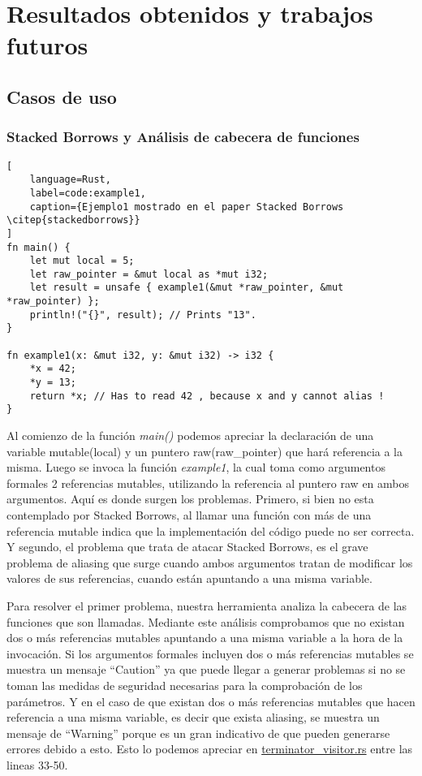 \chapter{Resultados obtenidos y trabajos futuros}
\section{Casos de uso}
\subsection{Stacked Borrows y Análisis de cabecera de funciones}

\begin{lstlisting}[
    language=Rust,
    label=code:example1,
    caption={Ejemplo1 mostrado en el paper Stacked Borrows \citep{stackedborrows}}
]
fn main() {
    let mut local = 5;
    let raw_pointer = &mut local as *mut i32;
    let result = unsafe { example1(&mut *raw_pointer, &mut *raw_pointer) };
    println!("{}", result); // Prints "13".
}

fn example1(x: &mut i32, y: &mut i32) -> i32 {
    *x = 42;
    *y = 13;
    return *x; // Has to read 42 , because x and y cannot alias !
}
\end{lstlisting}

Al comienzo de la función \textit{main()} podemos apreciar la declaración de una variable mutable(local) y un puntero raw(raw\_pointer) que hará referencia a la misma. Luego se invoca la función \textit{example1}, la cual toma como argumentos formales 2 referencias mutables, utilizando la referencia al puntero raw en ambos argumentos. Aquí es donde surgen los problemas. Primero, si bien no esta contemplado por Stacked Borrows, al llamar una función con más de una referencia mutable indica que la implementación del código puede no ser correcta. Y segundo, el problema que trata de atacar Stacked Borrows, es el grave problema de aliasing que surge cuando ambos argumentos tratan de modificar los valores de sus referencias, cuando están apuntando a una misma variable.

Para resolver el primer problema, nuestra herramienta analiza la cabecera de las funciones que son llamadas. Mediante este análisis comprobamos que no existan dos o más referencias mutables apuntando a una misma variable a la hora de la invocación. Si los argumentos formales incluyen dos o más referencias mutables se muestra un mensaje ``Caution'' ya que puede llegar a generar problemas si no se toman las medidas de seguridad necesarias para la comprobación de los parámetros. Y en el caso de que existan dos o más referencias mutables que hacen referencia a una misma variable, es decir que exista aliasing, se muestra un mensaje de ``Warning'' porque es un gran indicativo de que pueden generarse errores debido a esto. Esto lo podemos apreciar en \href{run:../src/mir_visitor/terminator_visitor.rs}{terminator\_visitor.rs} entre las lineas 33-50.

